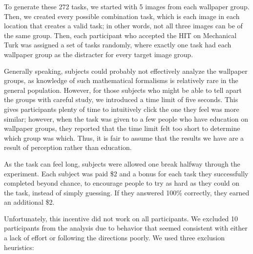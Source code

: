 To generate these 272 tasks, we started with 5 images from each wallpaper group. Then, we created every possible combination task, which is each image in each location that creates a valid task; in other words, not all three images can be of the same group. Then, each participant who accepted the HIT on Mechanical Turk was assigned a set of tasks randomly, where exactly one task had each wallpaper group as the distracter for every target image group.

Generally speaking, subjects could probably not effectively analyze the wallpaper groups, as knowledge of such mathematical formalisms is relatively rare in the general population. However, for those subjects who might be able to tell apart the groups with careful study, we introduced a time limit of five seconds. This gives participants plenty of time to intuitively click the one they feel was more similar; however, when the task was given to a few people who have education on wallpaper groups, they reported that the time limit felt too short to determine which group was which. Thus, it is fair to assume that the results we have are a result of perception rather than education.

As the task can feel long, subjects were allowed one break halfway through the experiment. Each subject was paid \$2 and a bonus for each task they successfully completed beyond chance, to encourage people to try as hard as they could on the task, instead of simply guessing. If they answered 100\% correctly, they earned an additional \$2. 

Unfortunately, this incentive did not work on all participants. We excluded 10 participants from the analysis due to behavior that seemed consistent with either a lack of effort or following the directions poorly. We used three exclusion heuristics:

